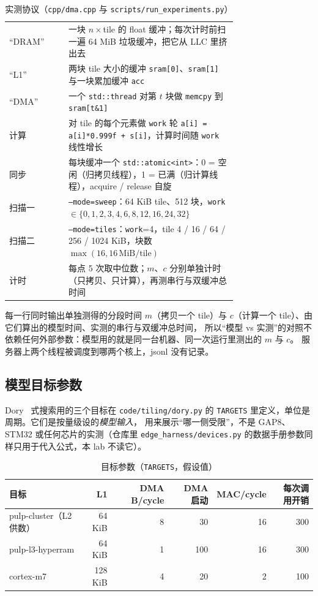 \documentclass[11pt,a4paper]{ctexart}
\begin{document}
\begin{table}[H]
\centering\small
\caption{实测协议（\texttt{cpp/dma.cpp} 与 \texttt{scripts/run\_experiments.py}）}\label{tab:protocol}
\begin{tabular}{lp{0.74\linewidth}}
\toprule
“DRAM” & 一块 $n\times$tile 的 float 缓冲；每次计时前扫一遍 64 MiB 垃圾缓冲，把它从 LLC 里挤出去 \\
“L1” & 两块 tile 大小的缓冲 \texttt{sram[0]}、\texttt{sram[1]} 与一块累加缓冲 \texttt{acc} \\
“DMA” & 一个 \texttt{std::thread} 对第 $t$ 块做 \texttt{memcpy} 到 \texttt{sram[t\&1]} \\
计算 & 对 tile 的每个元素做 \texttt{work} 轮 \texttt{a[i] = a[i]*0.999f + s[i]}，计算时间随 \texttt{work} 线性增长 \\
同步 & 每块缓冲一个 \texttt{std::atomic<int>}：0 = 空闲（归拷贝线程），1 = 已满（归计算线程），acquire / release 自旋 \\
扫描一 & \texttt{--mode=sweep}：64 KiB tile、512 块，\texttt{work} $\in\{0,1,2,3,4,6,8,12,16,24,32\}$ \\
扫描二 & \texttt{--mode=tiles}：\texttt{work}=4，tile 4 / 16 / 64 / 256 / 1024 KiB，块数 $\max(16, 16\,\text{MiB}/\text{tile})$ \\
计时 & 每点 5 次取中位数；$m$、$c$ 分别单独计时（只拷贝、只计算），再测串行与双缓冲总时间 \\
\bottomrule
\end{tabular}
\end{table}

每一行同时输出单独测得的分段时间 $m$（拷贝一个 tile）与 $c$（计算一个 tile）、由它们算出的模型时间、实测的串行与双缓冲总时间，
所以“模型 vs 实测”的对照不依赖任何外部参数：模型用的就是同一台机器、同一次运行里测出的 $m$ 与 $c$。
服务器上两个线程被调度到哪两个核上，jsonl 没有记录。

\subsection{模型目标参数}

Dory~\cite{dory} 式搜索用的三个目标在 \texttt{code/tiling/dory.py} 的 \texttt{TARGETS} 里定义，单位是周期。它们是按量级设的\emph{模型输入}，
用来展示“哪一侧受限”，不是 GAP8、STM32 或任何芯片的实测（仓库里 \texttt{edge\_harness/devices.py} 的数据手册参数同样只用于代入公式，本 lab 不读它）。

\begin{table}[H]
\centering\small
\caption{目标参数（\texttt{TARGETS}，假设值）}\label{tab:targets}
\begin{tabular}{lrrrrr}
\toprule
目标 & L1 & DMA B/cycle & DMA 启动 & MAC/cycle & 每次调用开销 \\
\midrule
pulp-cluster（L2 供数） & 64 KiB & 8 & 30 & 16 & 300 \\
pulp-l3-hyperram & 64 KiB & 1 & 100 & 16 & 300 \\
cortex-m7 & 128 KiB & 4 & 20 & 2 & 100 \\
\bottomrule
\end{tabular}
\end{table}
\end{document}
